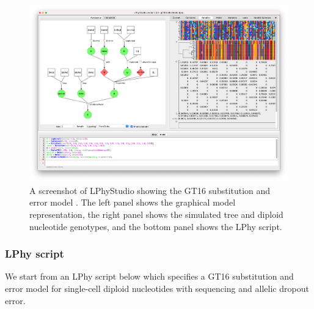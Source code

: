 \documentclass[10pt,letterpaper,table]{article}
\begin{document}
\begin{figure}[!ht]
    \centering
    \includegraphics[width=\textwidth]{figs_plos/lphystudio-gt16-mac.jpg}
    \caption{A screenshot of LPhyStudio showing the GT16 substitution and error model \cite{kozlov2022cellphy, chen2022accounting}. 
    The left panel shows the graphical model representation, the right panel shows the simulated tree and diploid nucleotide genotypes, and the bottom panel shows the LPhy script. }
\end{figure}

\subsubsection*{LPhy script}
We start from an LPhy script below which specifies a GT16 substitution and error model \cite{kozlov2022cellphy} for single-cell diploid nucleotides with sequencing and allelic dropout error.
\end{document}

